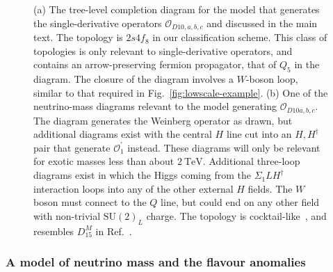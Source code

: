 \begin{figure}[t]
  \centering
  \caption{(a) The tree-level completion diagram for the model that generates
    the single-derivative operators $\mathcal{O}_{D10,a,b,c}$ and discussed in
    the main text. The topology is $2s4f_{8}$ in our classification scheme. This
    class of topologies is only relevant to single-derivative operators, and
    contains an arrow-preserving fermion propagator, that of $Q_{5}$ in the
    diagram. The closure of the diagram involves a $W$-boson loop, similar to
    that required in Fig.~\ref{fig:lowscale-example}. (b) One of the
    neutrino-mass diagrams relevant to the model generating
    $\mathcal{O}_{D10a,b,c}$. The diagram generates the Weinberg operator as
    drawn, but additional diagrams exist with the central $H$ line cut into an
    $H,H^{\dagger}$ pair that generate $\mathcal{O}^{\prime}_{1}$ instead. These
    diagrams will only be relevant for exotic masses less than about
    $\SI{2}{\TeV}$. Additional three-loop diagrams exist in which the Higgs
    coming from the $\Sigma_{1}LH^{\dagger}$ interaction loops into any of the
    other external $H$ fields. The $W$ boson must connect to the $Q$ line, but
    could end on any other field with non-trivial $\mathrm{SU}(2)_{L}$ charge.
    The topology is cocktail-like~\cite{Gustafsson:2012vj}, and resembles
    $D^{M}_{15}$ in Ref.~\cite{Cepedello:2018rfh}.}
  \label{fig:derivative-example-diagrams}
\end{figure}

\subsubsection{A model of neutrino mass and the flavour anomalies}

